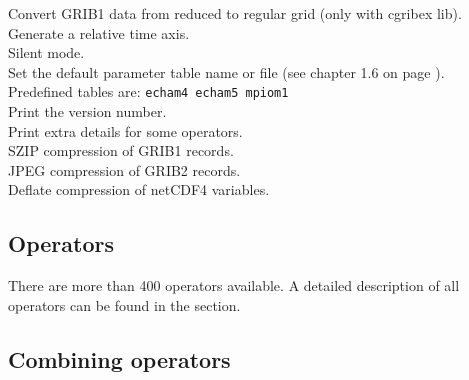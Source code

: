 \begin{tabbing}
         \> Convert GRIB1 data from reduced to regular grid (only with cgribex lib). \\
         \> Generate a relative time axis. \\
         \> Silent mode. \\
         \> Set the default parameter table name or file (see chapter 1.6 on page \pageref{PARAMETER_TABLE}).\\
         \> Predefined tables are:  {\tt echam4 echam5 mpiom1}\\
         \> Print the version number. \\
         \> Print extra details for some operators. \\
         \> SZIP compression of GRIB1 records. \\
         \> JPEG compression of GRIB2 records. \\
         \> Deflate compression of netCDF4 variables. \\
\end{tabbing}

\subsection{Operators}

There are more than 400 operators available.
A detailed description of all operators can be found in the
{\bf {}} section.


\subsection{Combining operators}

